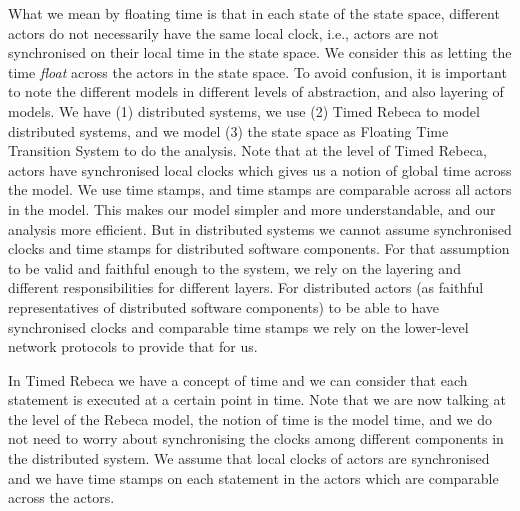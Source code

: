 What we mean by floating time is that in each state of the state space, different actors do not necessarily have the same local clock, i.e.,  actors are not synchronised on their local time in the state space. We consider this as letting the time \textit{float} across the actors in the state space. 
To avoid confusion, it is important to note the different models in different levels of abstraction, and also layering of models. We have (1) distributed systems, we use (2) Timed Rebeca to model distributed systems, and we model (3) the state space as Floating Time Transition System to do the analysis. 
%
Note that at the level of Timed Rebeca, actors have synchronised local clocks which gives us a notion of global time across the model. We use time stamps, and time stamps are comparable across all actors in the model. This makes our model simpler and more understandable, and our analysis more efficient.
But in distributed systems we cannot assume synchronised clocks and time stamps for distributed software components. 
For that assumption to be valid and faithful enough to the system,  we rely on the layering and different responsibilities for different layers. For distributed actors (as faithful representatives of distributed software components) to be able to have synchronised clocks and comparable time stamps we rely on the lower-level network protocols to provide that for us. 

In Timed Rebeca we have a concept of time and we can consider that each statement is executed at a certain point in time. Note that we are now talking at the level of the Rebeca model, the notion of time is the model time, and we do not need to worry about synchronising the clocks among different components in the distributed system. We assume that local clocks of actors are synchronised and we  have time stamps on each statement  in the actors which are comparable across the actors.

